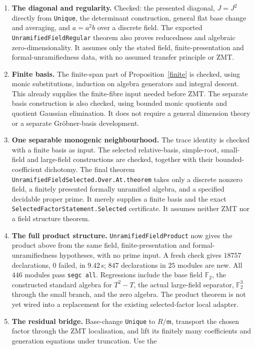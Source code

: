 \documentclass[11pt]{article}
\begin{document}
\begin{enumerate}
\item \textbf{The diagonal and regularity.}
Checked: the presented diagonal, $J=J^2$ directly from
\texttt{Unique}, the determinant construction, general flat base change
and averaging, and $a=a^2b$ over a discrete field.  The exported
\texttt{UnramifiedFieldRegular} theorem also proves reducedness and
algebraic zero-dimensionality.  It assumes only the stated field,
finite-presentation and formal-unramifiedness data, with no assumed
transfer principle or ZMT.
\item \textbf{Finite basis.}
The finite-span part of Proposition~\ref{finite} is checked, using monic
substitutions, induction on algebra generators and integral descent.
This already supplies the finite-fibre input needed before ZMT.
The separate basis construction is also checked, using bounded monic
quotients and quotient Gaussian elimination. It does not require a general
dimension theory or a separate Gr\"obner-basis development.
\item \textbf{One separable monogenic neighbourhood.}
The trace identity is checked with a finite basis as input.
The selected relative-basis, simple-root, small-field and large-field
constructions are checked, together with their bounded-coefficient
dichotomy. The final theorem
\texttt{UnramifiedFieldSelected.Over.At.theorem} takes only a discrete
nonzero field, a finitely presented formally unramified algebra, and a
specified decidable proper prime. It merely supplies a finite basis
and the exact \texttt{SelectedFactorStatement.Selected} certificate.
It assumes neither ZMT nor a field structure theorem.
\item \textbf{The full product structure.}
\texttt{UnramifiedFieldProduct} now gives the product above from the
same field, finite-presentation and formal-unramifiedness hypotheses,
with no prime input. A fresh check gives $18757$ declarations,
$0$ failed, in $9.42$\,s; $847$ declarations in $25$ modules are new.
All $446$ modules pass \texttt{segc all}. Regressions include the base
field $\mathbb F_2$, the constructed standard algebra for $T^2-T$,
the actual large-field separator, $\mathbb F_2^3$ through the small
branch, and the zero algebra. The product theorem is not yet wired
into a replacement for the existing selected-factor local adapter.
\item \textbf{The residual bridge.}
Base-change \texttt{Unique} to $R/\mathfrak m$, transport the chosen
factor through the ZMT localisation, and lift its finitely many
coefficients and generation equations under truncation.  Use the

\end{enumerate}
\end{document}
